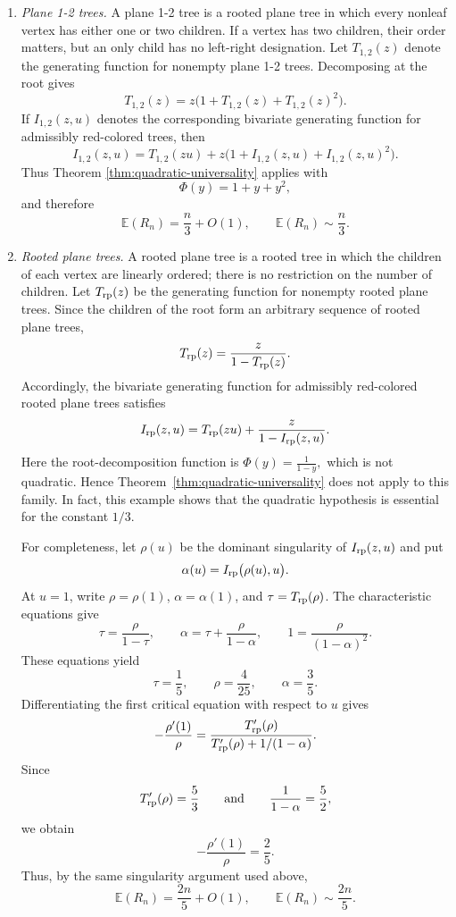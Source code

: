 \documentclass[10pt,a4paper]{amsart}
\theoremstyle{remark}
\begin{document}
\begin{enumerate}

\item \emph{Plane 1-2 trees.}
A plane 1-2 tree is a rooted plane tree in which every nonleaf vertex has either one or two children. If a vertex has two children, their order matters, but an only child has no left-right designation. Let $T_{1,2}(z)$ denote the generating function for nonempty plane 1-2 trees. Decomposing at the root gives
\[
T_{1,2}(z)=z\bigl(1+T_{1,2}(z)+T_{1,2}(z)^2\bigr).
\]
If $I_{1,2}(z,u)$ denotes the corresponding bivariate generating function for admissibly red-colored trees, then
\[
I_{1,2}(z,u)
=
T_{1,2}(zu)
+z\bigl(1+I_{1,2}(z,u)+I_{1,2}(z,u)^2\bigr).
\]
Thus Theorem \ref{thm:quadratic-universality} applies with
\[
\Phi(y)=1+y+y^2,
\]
and therefore
\[
\mathbb E(R_n)=\frac{n}{3}+O(1),
\qquad
\mathbb E(R_n)\sim \frac{n}{3}.
\]

\item \emph{Rooted plane trees.}
A rooted plane tree is a rooted tree in which the children of each vertex are linearly ordered; there is no restriction on the number of children. Let $T_{\rm rp}(z)$ be the generating function for nonempty rooted plane trees. Since the children of the root form an arbitrary sequence of rooted plane trees,
\[
T_{\rm rp}(z)
=
\frac{z}{1-T_{\rm rp}(z)}.
\]
Accordingly, the bivariate generating function for admissibly red-colored rooted plane trees satisfies
\[
I_{\rm rp}(z,u)
=
T_{\rm rp}(zu)
+
\frac{z}{1-I_{\rm rp}(z,u)}.
\]
Here the root-decomposition function is
$
\Phi(y)=\frac{1}{1-y},
$
which is not quadratic. Hence Theorem~\ref{thm:quadratic-universality} does not apply to this family. In fact, this example shows that the quadratic hypothesis is essential for the constant $1/3$.

For completeness, let $\rho(u)$ be the dominant singularity of $I_{\rm rp}(z,u)$ and put
\[
\alpha(u)=I_{\rm rp}\big(\rho(u),u\big).
\]
At $u=1$, write $\rho=\rho(1)$, $\alpha=\alpha(1)$, and $\tau=T_{\rm rp}(\rho)$. The characteristic equations give
\[
\tau=\frac{\rho}{1-\tau},
\qquad
\alpha=\tau+\frac{\rho}{1-\alpha},
\qquad
1=\frac{\rho}{(1-\alpha)^2}.
\]
These equations yield
\[
\tau=\frac15,
\qquad
\rho=\frac{4}{25},
\qquad
\alpha=\frac35.
\]
Differentiating the first critical equation with respect to $u$ gives
\[
-\frac{\rho'(1)}{\rho}
=
\frac{T_{\rm rp}'(\rho)}
{T_{\rm rp}'(\rho)+1/(1-\alpha)}.
\]
Since
\[
T_{\rm rp}'(\rho)=\frac53
\qquad\hbox{and}\qquad
\frac{1}{1-\alpha}=\frac52,
\]
we obtain
\[
-\frac{\rho'(1)}{\rho}=\frac25.
\]
Thus, by the same singularity argument used above,
\[
\mathbb E(R_n)=\frac{2n}{5}+O(1),
\qquad
\mathbb E(R_n)\sim\frac{2n}{5}.
\]


\end{enumerate}
\end{document}
